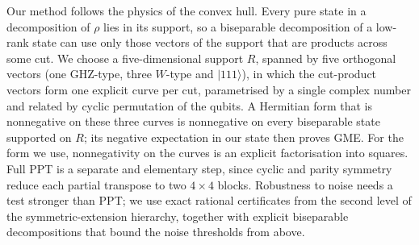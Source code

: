 \documentclass[11pt]{article}
\theoremstyle{remark}
\newcommand{\ket}[1]{\lvert#1\rangle}
\begin{document}
Our method follows the physics of the convex hull. Every pure state in a decomposition of $\rho$ lies in its support,
so a biseparable decomposition of a low-rank state can use only those vectors of the support that are products across some
cut. We choose a five-dimensional support $R$, spanned by five orthogonal vectors (one GHZ-type, three $W$-type and $\ket{111}$), in which the cut-product
vectors form one explicit curve per cut, parametrised by a single complex number and related by cyclic permutation of the
qubits. A Hermitian form that is nonnegative on these three curves is nonnegative on every biseparable state supported on
$R$; its negative expectation in our state then proves GME. For the form we use, nonnegativity on the curves is an explicit
factorisation into squares. Full PPT is a separate and elementary step, since cyclic and parity symmetry reduce each
partial transpose to two $4\times4$ blocks. Robustness to noise needs a test stronger than PPT; we use exact rational
certificates from the second level of the symmetric-extension hierarchy, together with explicit biseparable decompositions
that bound the noise thresholds from above.
\end{document}
